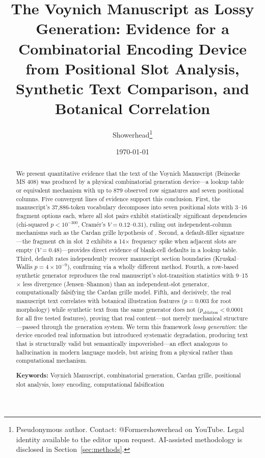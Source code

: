 \documentclass[12pt]{article}
\title{The Voynich Manuscript as Lossy Generation: Evidence for a Combinatorial Encoding Device from Positional Slot Analysis, Synthetic Text Comparison, and Botanical Correlation}
\author{%
  Showerhead\thanks{Pseudonymous author. Contact: @Formershowerhead on YouTube. Legal identity available to the editor upon request. AI-assisted methodology is disclosed in Section~\ref{sec:methods}.}
}
\date{\today}
\begin{document}
\maketitle

\begin{abstract}
We present quantitative evidence that the text of the Voynich Manuscript (Beinecke MS 408) was produced by a physical combinatorial generation device---a lookup table or equivalent mechanism with up to 879 observed row signatures and seven positional columns. Five convergent lines of evidence support this conclusion. First, the manuscript's 37,886-token vocabulary decomposes into seven positional slots with 3--16 fragment options each, where all slot pairs exhibit statistically significant dependencies (chi-squared $p < 10^{-300}$, Cram\'{e}r's $V = 0.12$--$0.31$), ruling out independent-column mechanisms such as the Cardan grille hypothesis of \citet{Rugg2004}. Second, a default-filler signature---the fragment \texttt{ch} in slot~2 exhibits a 14$\times$ frequency spike when adjacent slots are empty ($V = 0.48$)---provides direct evidence of blank-cell defaults in a lookup table. Third, default rates independently recover manuscript section boundaries (Kruskal--Wallis $p = 4 \times 10^{-9}$), confirming \citet{Montemurro2013} via a wholly different method. Fourth, a row-based synthetic generator reproduces the real manuscript's slot-transition statistics with 9--15$\times$ less divergence (Jensen--Shannon) than an independent-slot generator, computationally falsifying the Cardan grille model. Fifth, and decisively, the real manuscript text correlates with botanical illustration features ($p = 0.003$ for root morphology) while synthetic text from the same generator does not ($p_{\text{ablation}} < 0.0001$ for all five tested features), proving that real content---not merely mechanical structure---passed through the generation system. We term this framework \emph{lossy generation}: the device encoded real information but introduced systematic degradation, producing text that is structurally valid but semantically impoverished---an effect analogous to hallucination in modern language models, but arising from a physical rather than computational mechanism.

\medskip
\noindent\textbf{Keywords:} Voynich Manuscript, combinatorial generation, Cardan grille, positional slot analysis, lossy encoding, computational falsification
\end{abstract}
\end{document}
